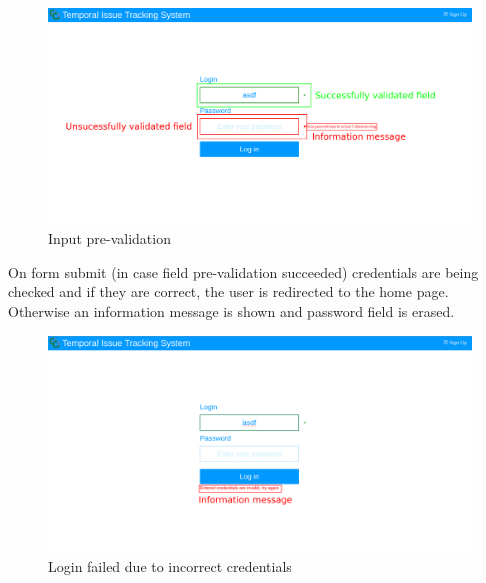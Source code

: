 \documentclass{article}
\begin{document}
\begin{figure}[H]
    \includegraphics[width=\textwidth]{img/loginvalidation.png}
    \caption{Input pre-validation}
\end{figure}
On form submit (in case field pre-validation succeeded) credentials are being checked and if they are correct, the user is redirected to the home page. Otherwise an information message is shown and password field is erased.
\begin{figure}[H]
    \includegraphics[width=\textwidth]{img/loginfailed.png}
    \caption{Login failed due to incorrect credentials}
\end{figure}
\end{document}
